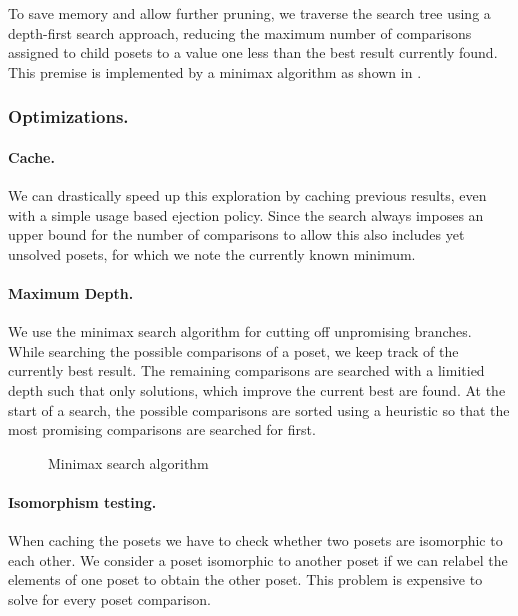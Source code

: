 \documentclass[twoside,leqno,twocolumn]{article}
\begin{document}
To save memory and allow further pruning, we traverse the search tree using a depth-first search approach, reducing the maximum number of comparisons assigned to child posets to a value one less than the best result currently found.
This premise is implemented by a minimax algorithm as shown in .



\subsubsection{Optimizations.}

\paragraph{Cache.}
We can drastically speed up this exploration by caching previous results, even with a simple usage based ejection policy.
Since the search always imposes an upper bound for the number of comparisons to allow this also includes yet unsolved posets, for which we note the currently known minimum.

\paragraph{Maximum Depth.}
We use the minimax search algorithm for cutting off unpromising branches.
While searching the possible comparisons of a poset, we keep track of the currently best result.
The remaining comparisons are searched with a limitied depth such that only solutions, which improve the current best are found.
At the start of a search, the possible comparisons are sorted using a heuristic so that the most promising comparisons are searched for first.

\begin{figure}[!b]
  \centering
  
  \caption{Minimax search algorithm}
  \label{fig:minimax_search}
\end{figure}

\paragraph{Isomorphism testing.}
When caching the posets we have to check whether two posets are isomorphic to each other.
We consider a poset isomorphic to another poset if we can relabel the elements of one poset to obtain the other poset.
This problem is expensive to solve for every poset comparison.
\end{document}
